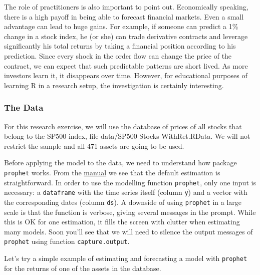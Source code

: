 \documentclass[11pt,]{book}
\begin{document}
The role of practitioners is also important to point out. Economically
speaking, there is a high payoff in being able to forecast financial
markets. Even a small advantage can lead to huge gains. For example, if
someone can predict a 1\% change in a stock index, he (or she) can trade
derivative contracts and leverage significantly his total returns by
taking a financial position according to his prediction. Since every
shock in the order flow can change the price of the contract, we can
expect that such predictable patterns are short lived. As more investors
learn it, it disappears over time. However, for educational purposes of
learning R in a research setup, the investigation is certainly
interesting.

\subsubsection{The Data}\label{the-data-1}

For this research exercise, we will use the database of prices of all
stocks that belong to the SP500 index, file
data/SP500-Stocks-WithRet.RData. We will not restrict the sample and all
471 assets are going to be used.

Before applying the model to the data, we need to understand how package
\texttt{prophet} works. From the
\href{https://facebookincubator.github.io/prophet/docs/quick_start.html\#r-api}{manual}
we see that the default estimation is straightforward. In order to use
the modelling function \texttt{prophet}, only one input is necessary: a
\texttt{dataframe} with the time series itself (column \texttt{y}) and a
vector with the corresponding dates (column \texttt{ds}). A downside of
using \texttt{prophet} in a large scale is that the function is verbose,
giving several messages in the prompt. While this is OK for one
estimation, it fills the screen with clutter when estimating many
models. Soon you'll see that we will need to silence the output messages
of \texttt{prophet} using function \texttt{capture.output}.

Let's try a simple example of estimating and forecasting a model with
\texttt{prophet} for the returns of one of the assets in the database.
\end{document}

